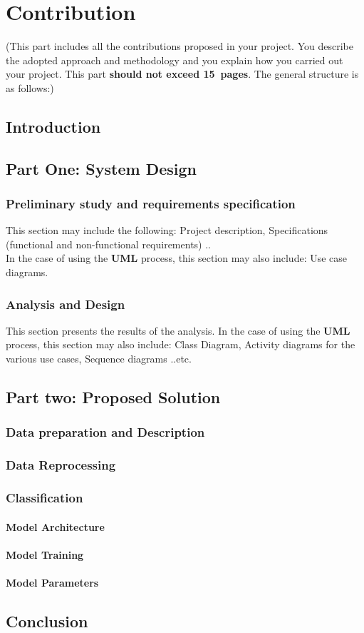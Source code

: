 \chapter{Contribution} \label{chap:analysis}

(This part includes all the contributions proposed in your project. You describe the adopted approach and methodology and you explain how you carried out your project. This part \textbf{should not exceed 15~pages}. The general structure is as follows:)

\section*{Introduction}

\section{Part One: System Design} 

\subsection{Preliminary study and requirements specification}
This section may include the following: Project description, Specifications (functional and non-functional requirements) .. \\
In the case of using the \textbf{UML} process, this section may also include: Use case diagrams.

\subsection{Analysis and Design}

This section presents the results of the analysis.
In the case of using the \textbf{UML} process, this section may also include: Class Diagram,  Activity diagrams for the various use cases, Sequence diagrams ..etc.

\section{Part two: Proposed Solution} 

\subsection{Data preparation and Description}
\subsection{Data Reprocessing}
\subsection{Classification}
\subsubsection{Model Architecture }
\subsubsection{Model Training }
\subsubsection{Model Parameters }
\section*{Conclusion}